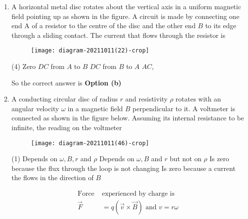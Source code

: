 \begin{enumerate}
\begin{answer}
\begin{align*}
	\text{	Induced e.m.f }\varepsilon& =-\frac{d \phi}{d t}, \quad|l(t)|=\frac{|\varepsilon|}{R} \propto\left|\frac{d l s}{d t}\right|
	\intertext{So when current increases,$|I(t)|$  will increase and when it will decrease $|I(t)|$ will
		decrease.}
	\end{align*}
	So the correct answer is \textbf{Option (d)}
\end{answer}
	\item A horizontal metal disc rotates about the vertical axis in a uniform magnetic field pointing up as shown in the figure. A circuit is made by connecting one end A of a resistor to the centre of the disc and the other end $B$ to its edge through a sliding contact. The current that flows through the resistor is
	{}
	\begin{figure}[H]
		\centering
		\texttt{[image: diagram-20211011(22)-crop]}
	\end{figure}
	\begin{tasks}(4)
		\task[\textbf{a.}] Zero
		\task[\textbf{b.}] $D C$ from $A$ to $B$
		\task[\textbf{c.}] $D C$ from $B$ to $A$
		\task[\textbf{d.}] $A C$,
	\end{tasks}
\begin{answer}
	So the correct answer is \textbf{Option (b)}
\end{answer}
	\item  A conducting circular disc of radius $r$ and resistivity $\rho$ rotates with an angular velocity $\omega$ in a magnetic field $B$ perpendicular to it. A voltmeter is connected as shown in the figure below. Assuming its internal resistance to be infinite, the reading on the voltmeter
	{}
	\begin{figure}[H]
		\centering
		\texttt{[image: diagram-20211011(46)-crop]}
	\end{figure}
	\begin{tasks}(1)
		\task[\textbf{a.}] Depends on $\omega, B, r$ and $\rho$
		\task[\textbf{b.}] Depends on $\omega, B$ and $r$ but not on $\rho$
		\task[\textbf{c.}]  Is zero because the flux through the loop is not changing
		\task[\textbf{d.}] Is zero because a current the flows in the direction of $B$
	\end{tasks}	
\begin{answer}
	\begin{align*}
	\text{Force }&\text{experienced by charge is}\\
	\vec{F}&=q(\vec{v} \times \vec{B})\text{ and }v=r \omega

\end{align*}
\end{answer}
\end{enumerate}

